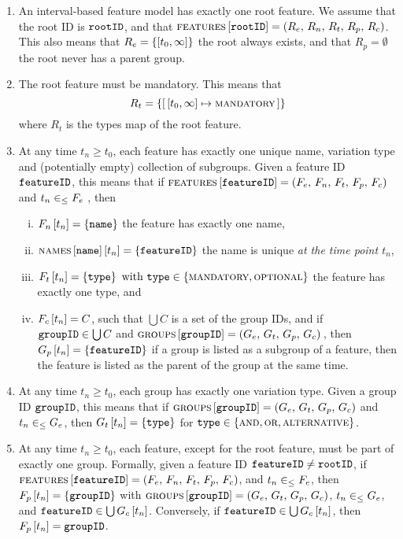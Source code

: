 \begin{enumerate}[\wf{\arabic*}, itemsep=0mm]
   \item An interval-based feature model has exactly one root feature. We assume that the root ID is $\texttt{rootID}$, and that $\textsc{features} \left[ \texttt{rootID} \right] = \left(R_e,\, R_n,\, R_t,\, R_p,\, R_c\right)$. This also means that $R_e=\set{\interval{t_0}{\forever}}$ \textemdash{} the root always exists, and that $R_p = \emptyset$ \textemdash{} the root never has a parent group.
\item The root feature must be mandatory. This means that $$R_t  = \set{\intervalmapping{t_0}{\forever}{\mandatory}}$$ where $R_t$ is the types map of the root feature. 
\item At any time $t_n \geq t_0$, each feature has exactly one unique name, variation type and (potentially empty) collection of subgroups. Given a feature ID $\texttt{featureID}$, this means that if $\textsc{features} \left[ \texttt{featureID} \right] = \left(F_e,\, F_n,\, F_t,\, F_p,\, F_c\right)$ and $t_n \in_\leq F_e$ , then
   \begin{enumerate}[(i)]
      \item $F_n \left[ t_n \right] = \left\{\texttt{name}\right\}$ \textemdash{} the feature has exactly one name,
      \item $\textsc{names} \left[ \texttt{name} \right] \left[ t_n \right] = \left\{\texttt{featureID}\right\}$ \textemdash{} the name is unique \emph{at the time point $t_n$},
      \item $F_t \left[ t_n \right] = \left\{\texttt{type}\right\} \text{ with } \texttt{type} \in \left\{\textsc{mandatory}, \textsc{optional}\right\}$ \textemdash{} the feature has exactly one type, and
      \item $F_c \left[ t_n \right] = C$, such that $\bigcup C$ is a set of the group IDs, and if $\texttt{groupID} \in \bigcup C$ and $\textsc{groups}{} \left[ \texttt{groupID} \right] = \left(G_e,\, G_t,\, G_p,\, G_c\right){}$, then $G_p \left[ t_n \right] = \left\{\texttt{featureID}\right\}$ \textemdash{} if a group is listed as a subgroup of a feature, then the feature is listed as the parent of the group at the same time.
   \end{enumerate}
   \item At any time $t_n \geq t_0$, each group has exactly one variation type. Given a group ID $\texttt{groupID}$, this means that if $\textsc{groups}{} \left[ \texttt{groupID} \right] = \left(G_e,\, G_t,\, G_p,\, G_c\right)$ and $t_n \in_\leq G_e$, then $G_t \left[ t_n \right] = \left\{\texttt{type}\right\}$ for $\texttt{type} \in \left\{\textsc{and}, \textsc{or}, \textsc{alternative}\right\}$.
   \item At any time $t_n \geq t_0$, each feature, except for the root feature, must be part of exactly one group. Formally, given a feature ID $\texttt{featureID} \neq \texttt{rootID}$, if $\textsc{features} \left[ \texttt{featureID} \right] = \left(F_e,\, F_n,\, F_t,\, F_p,\, F_c\right)$, and $t_n \in_\leq F_e$, then $F_p \left[ t_n \right] = \left\{\texttt{groupID}\right\}$ with $\textsc{groups}{} \left[ \texttt{groupID} \right] = \left(G_e,\, G_t,\, G_p,\, G_c\right)$, $t_n \in_\leq G_e$, and $\texttt{featureID} \in \bigcup G_c \left[ t_n \right]$. Conversely, if $\texttt{featureID} \in \bigcup G_c \left[ t_n \right]$, then $F_p \left[ t_n \right] = \texttt{groupID}$.

\end{enumerate}

